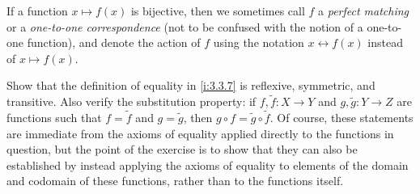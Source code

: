 \setcounter{thm}{22}
\begin{rmk}\label{i:3.3.23}
  If a function \(x \mapsto f(x)\) is bijective, then we sometimes call \(f\) a \emph{perfect matching} or a \emph{one-to-one correspondence} (not to be confused with the notion of a one-to-one function), and denote the action of \(f\) using the notation \(x \leftrightarrow f(x)\) instead of \(x \mapsto f(x)\).
\end{rmk}

\exercisesection

\begin{ex}\label{i:ex:3.3.1}
  Show that the definition of equality in \cref{i:3.3.7} is reflexive, symmetric, and transitive.
  Also verify the substitution property: if \(f, \tilde{f} : X \to Y\) and \(g, \tilde{g} : Y \to Z\) are functions such that \(f = \tilde{f}\) and \(g = \tilde{g}\), then \(g \circ f = \tilde{g} \circ \tilde{f}\).
  Of course, these statements are immediate from the axioms of equality applied directly to the functions in question, but the point of the exercise is to show that they can also be established by instead applying the axioms of equality to elements of the domain and codomain of these functions, rather than to the functions itself.
\end{ex}

